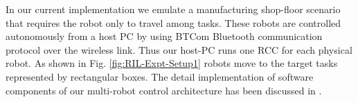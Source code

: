 \documentclass[journal]{IEEEtran}
\begin{document}
In our current implementation we emulate a manufacturing shop-floor scenario that requires the robot only to travel among tasks.
These robots are controlled autonomously from a host PC by using BTCom Bluetooth communication protocol over the wireless link. Thus our host-PC runs one RCC for each physical robot. As shown in Fig. \ref{fig:RIL-Expt-Setup1} %
robots  move to the target tasks represented by rectangular boxes. The detail implementation of software components of our multi-robot control architecture  has been discussed in \cite{Sarker2010}.
\end{document}
